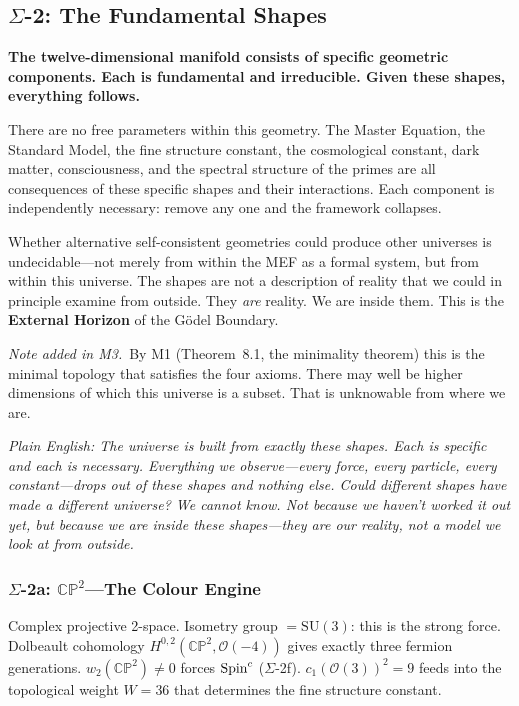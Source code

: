 \subsection*{$\Sigma$-2: The Fundamental Shapes}
\par\smallskip
\textbf{The twelve-dimensional manifold consists of specific geometric components.  Each is fundamental and irreducible.  Given these shapes, everything follows.}

There are no free parameters within this geometry.  The Master Equation, the Standard Model, the fine structure constant, the cosmological constant, dark matter, consciousness, and the spectral structure of the primes are all consequences of these specific shapes and their interactions.  Each component is independently necessary: remove any one and the framework collapses.

Whether alternative self-consistent geometries could produce other universes is undecidable---not merely from within the MEF as a formal system, but from within this universe.  The shapes are not a description of reality that we could in principle examine from outside.  They \emph{are} reality.  We are inside them.  This is the \textbf{External Horizon} of the G\"odel Boundary.

\noindent\emph{Note added in M3.}\ By M1 (Theorem~8.1, the minimality theorem) this is the minimal topology that satisfies the four axioms. There may well be higher dimensions of which this universe is a subset. That is unknowable from where we are.

\emph{Plain English: The universe is built from exactly these shapes.  Each is specific and each is necessary.  Everything we observe---every force, every particle, every constant---drops out of these shapes and nothing else.  Could different shapes have made a different universe?  We cannot know.  Not because we haven't worked it out yet, but because we are inside these shapes---they are our reality, not a model we look at from outside.}

\subsubsection*{$\Sigma$-2a: $\mathbb{CP}^2$---The Colour Engine}

Complex projective 2-space.  Isometry group $= \mathrm{SU}(3)$: this is the strong force.  Dolbeault cohomology $H^{0,2}(\mathbb{CP}^2, \mathcal{O}(-4))$ gives exactly three fermion generations.  $w_2(\mathbb{CP}^2) \neq 0$ forces $\text{Spin}^c$ ($\Sigma$-2f).  $c_1(\mathcal{O}(3))^2 = 9$ feeds into the topological weight $W = 36$ that determines the fine structure constant.

